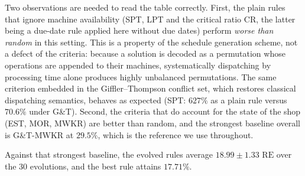 \documentclass[review,authoryear,11pt]{elsarticle}
\newcommand{\RE}{\mathrm{RE}}
\begin{document}
Two observations are needed to read the table correctly. First, the
plain rules that ignore machine availability (SPT, LPT and the critical
ratio CR, the latter being a due-date rule applied here without due
dates) perform \emph{worse than random} in this setting. This is a
property of the schedule generation scheme, not a defect of the
criteria: because a solution is decoded as a permutation whose
operations are appended to their machines, systematically dispatching
by processing time alone produces highly unbalanced permutations. The
same criterion embedded in the Giffler--Thompson conflict set, which
restores classical dispatching semantics, behaves as expected
(SPT: $627\%$ as a plain rule versus $70.6\%$ under G\&T). Second, the
criteria that do account for the state of the shop (EST, MOR, MWKR) are
better than random, and the strongest baseline overall is
G\&T-MWKR at $29.5\%$, which is the reference we use throughout.

Against that strongest baseline, the evolved rules average
$18.99 \pm 1.33$ $\RE$ over the 30 evolutions, and the best rule
attains $17.71\%$.
\end{document}
